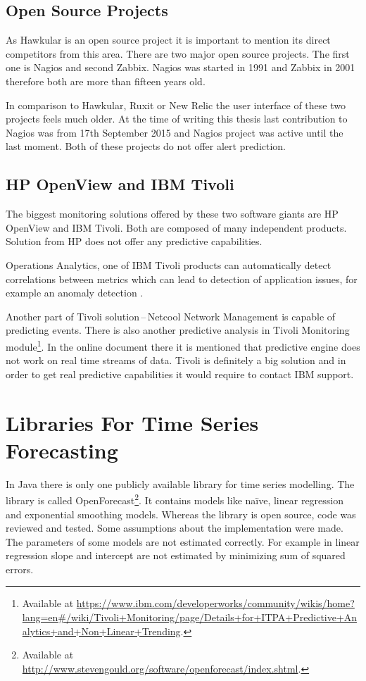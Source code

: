         \subsection{Open Source Projects}
        As Hawkular is an open source project it is important to mention its direct competitors from this area.
        There are two major open source projects. The first one is Nagios and second Zabbix. Nagios was started in
        1991 and Zabbix in 2001 therefore both are more than fifteen years old.

        In comparison to Hawkular, Ruxit or New Relic the user interface of these two projects feels much older.
        At the time of writing this thesis last contribution to Nagios was from 17th September 2015 and Nagios
        project was active until the last moment. Both of these projects do not offer alert prediction.

        \subsection{HP OpenView and IBM Tivoli}
        The biggest monitoring solutions offered by these two software giants are HP OpenView and IBM Tivoli. Both are
        composed of many independent products. Solution from HP does not offer any predictive capabilities.

        Operations Analytics, one of IBM Tivoli products can automatically detect correlations between
        metrics which can lead to detection of application issues, for example an anomaly detection
        \cite{tivoli-predictive-insights}.

        Another part of Tivoli solution\,--\,Netcool Network Management is capable
        of predicting events. There is also another predictive analysis in Tivoli Monitoring
        module\footnote{Available at
        \url{https://www.ibm.com/developerworks/community/wikis/home?lang=en\#/wiki/Tivoli+Monitoring/page/Details+for+ITPA+Predictive+Analytics+and+Non+Linear+Trending}.}.
        In the online document there it is mentioned that predictive engine does not work on real time streams of data.
        Tivoli is definitely a big solution and in order to get real predictive capabilities it would require to
        contact IBM support.

    \section{Libraries For Time Series Forecasting} \label{sec:libraries-for-ts}
    In Java there is only one publicly available library for time series modelling. The library is called
    OpenForecast\footnote{Available at \url{http://www.stevengould.org/software/openforecast/index.shtml}.}. It contains
    models like na\"{i}ve, linear regression and exponential smoothing models. Whereas the library is open source, code
    was reviewed and tested. Some assumptions about the implementation were made. The parameters of some models are
    not estimated correctly. For example in linear regression slope and intercept are not estimated by minimizing
    sum of squared errors.

